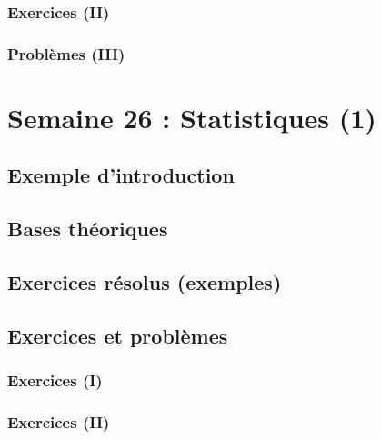 \documentclass[
  12pt,
]{book}
\begin{document}
\hypertarget{exercices-ii-24}{%
\subsection{Exercices (II)}\label{exercices-ii-24}}

\hypertarget{probluxe8mes-iii-24}{%
\subsection{Problèmes (III)}\label{probluxe8mes-iii-24}}

\hypertarget{semaine-26-statistiques-1}{%
\chapter{Semaine 26 : Statistiques (1)}\label{semaine-26-statistiques-1}}

\hypertarget{exemple-dintroduction-25}{%
\section{Exemple d'introduction}\label{exemple-dintroduction-25}}

\hypertarget{bases-thuxe9oriques-25}{%
\section{Bases théoriques}\label{bases-thuxe9oriques-25}}

\hypertarget{exercices-ruxe9solus-exemples-25}{%
\section{Exercices résolus (exemples)}\label{exercices-ruxe9solus-exemples-25}}

\hypertarget{exercices-et-probluxe8mes-25}{%
\section{Exercices et problèmes}\label{exercices-et-probluxe8mes-25}}

\hypertarget{exercices-i-25}{%
\subsection{Exercices (I)}\label{exercices-i-25}}

\hypertarget{exercices-ii-25}{%
\subsection{Exercices (II)}\label{exercices-ii-25}}
\end{document}

